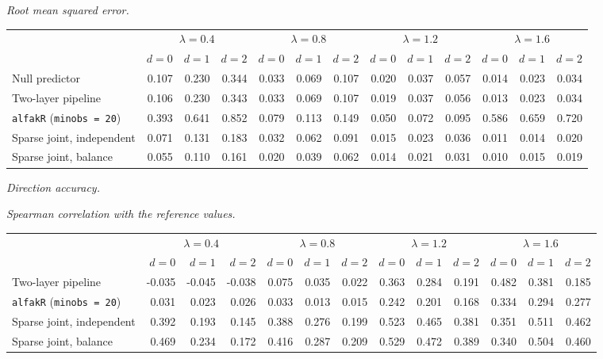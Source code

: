 \documentclass[11pt]{article}
\begin{document}
\noindent\textit{Root mean squared error.}
\begin{center}
\footnotesize
\setlength{\tabcolsep}{3pt}
\begin{tabular}{l*{12}{r}}
\toprule
 & \multicolumn{3}{c}{$\lambda=0.4$} & \multicolumn{3}{c}{$\lambda=0.8$} & \multicolumn{3}{c}{$\lambda=1.2$} & \multicolumn{3}{c}{$\lambda=1.6$} \\
\cmidrule(lr){2-4}\cmidrule(lr){5-7}\cmidrule(lr){8-10}\cmidrule(lr){11-13}
 & $d=0$ & $d=1$ & $d=2$ & $d=0$ & $d=1$ & $d=2$ & $d=0$ & $d=1$ & $d=2$ & $d=0$ & $d=1$ & $d=2$ \\
\midrule
Null predictor & 0.107 & 0.230 & 0.344 & 0.033 & 0.069 & 0.107 & 0.020 & 0.037 & 0.057 & 0.014 & 0.023 & 0.034 \\
Two-layer pipeline & 0.106 & 0.230 & 0.343 & 0.033 & 0.069 & 0.107 & 0.019 & 0.037 & 0.056 & 0.013 & 0.023 & 0.034 \\
\texttt{alfakR} (\texttt{minobs = 20}) & 0.393 & 0.641 & 0.852 & 0.079 & 0.113 & 0.149 & 0.050 & 0.072 & 0.095 & 0.586 & 0.659 & 0.720 \\
Sparse joint, independent & 0.071 & 0.131 & 0.183 & 0.032 & 0.062 & 0.091 & 0.015 & 0.023 & 0.036 & 0.011 & 0.014 & 0.020 \\
Sparse joint, balance & 0.055 & 0.110 & 0.161 & 0.020 & 0.039 & 0.062 & 0.014 & 0.021 & 0.031 & 0.010 & 0.015 & 0.019 \\
\bottomrule
\end{tabular}
\end{center}

\noindent\textit{Direction accuracy.}


\noindent\textit{Spearman correlation with the reference values.}
\begin{center}
\footnotesize
\setlength{\tabcolsep}{3pt}
\begin{tabular}{l*{12}{r}}
\toprule
 & \multicolumn{3}{c}{$\lambda=0.4$} & \multicolumn{3}{c}{$\lambda=0.8$} & \multicolumn{3}{c}{$\lambda=1.2$} & \multicolumn{3}{c}{$\lambda=1.6$} \\
\cmidrule(lr){2-4}\cmidrule(lr){5-7}\cmidrule(lr){8-10}\cmidrule(lr){11-13}
 & $d=0$ & $d=1$ & $d=2$ & $d=0$ & $d=1$ & $d=2$ & $d=0$ & $d=1$ & $d=2$ & $d=0$ & $d=1$ & $d=2$ \\
\midrule
Two-layer pipeline & -0.035 & -0.045 & -0.038 & 0.075 & 0.035 & 0.022 & 0.363 & 0.284 & 0.191 & 0.482 & 0.381 & 0.185 \\
\texttt{alfakR} (\texttt{minobs = 20}) & 0.031 & 0.023 & 0.026 & 0.033 & 0.013 & 0.015 & 0.242 & 0.201 & 0.168 & 0.334 & 0.294 & 0.277 \\
Sparse joint, independent & 0.392 & 0.193 & 0.145 & 0.388 & 0.276 & 0.199 & 0.523 & 0.465 & 0.381 & 0.351 & 0.511 & 0.462 \\
Sparse joint, balance & 0.469 & 0.234 & 0.172 & 0.416 & 0.287 & 0.209 & 0.529 & 0.472 & 0.389 & 0.340 & 0.504 & 0.460 \\
\bottomrule
\end{tabular}
\end{center}
\end{document}
